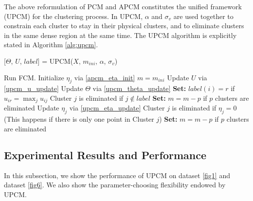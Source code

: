 \documentclass[journal,transmag]{IEEEtran}
\begin{document}
The above reformulation of PCM and APCM constitutes the unified framework (UPCM) for the clustering process. In UPCM, $\alpha$ and $\sigma_v$ are used together to constrain each cluster to stay in their physical clusters, and to eliminate clusters in the same dense region at the same time.
The UPCM algorithm is explicitly stated in Algorithm \ref{alg:upcm}.
\begin{algorithm}[H]
\caption{ [$\Theta$, $U$, $label$] = UPCM($X$, $m_{ini}$, $\alpha$, $\sigma_v$)}
\label{alg:upcm}
\begin{algorithmic}[1]
\State Run FCM.
\State Initialize $\eta_j$ via \eqref{apcm_eta_init}
\State $m=m_{ini}$
\Repeat
\State Update $U$ via \eqref{upcm_u_update}
\State Update $\Theta$ via \eqref{upcm_theta_update}
\State \textbf{Set:} $label(i)=r$ if $u_{ir}=\max_j u_{ij}$
\EndFor
\State Cluster $j$ is eliminated if $j \notin label$
\State \textbf{Set:} $m=m-p$ if  $p$ clusters are eliminated
\State Update $\eta_j$ via \eqref{upcm_eta_update}
\State Cluster $j$ is eliminated if $\eta_j=0$ (This happens if there is only one point in Cluster $j$)
\State \textbf{Set:} $m=m-p$ if  $p$ clusters are eliminated
\\
\end{algorithmic}
\end{algorithm}
\subsection{Experimental Results and Performance}
\label{sec-4-2}
In this subsection, we show the performance of UPCM on dataset \ref{fig1} and dataset \ref{fig6}. We also show the parameter-choosing flexibility endowed by UPCM.
\end{document}
